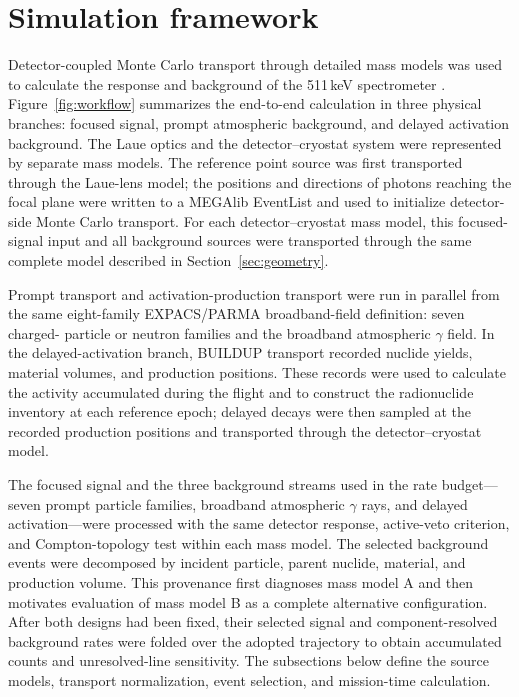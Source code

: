 \documentclass[11pt]{article}
\begin{document}
\FloatBarrier

\section{Simulation framework}
\label{sec:framework}

Detector-coupled Monte Carlo transport through detailed mass models was used to calculate the response and background of the 511\,keV spectrometer \cite{Sturner2003}. Figure~\ref{fig:workflow} summarizes the end-to-end calculation in three physical branches: focused signal, prompt atmospheric background, and delayed activation background. The Laue optics and the detector--cryostat system were represented by separate mass models. The reference point source was first transported through the Laue-lens model; the positions and directions of photons reaching the focal plane were written to a MEGAlib EventList and used to initialize detector-side Monte Carlo transport. For each detector--cryostat mass model, this focused-signal input and all background sources were transported through the same complete model described in Section~\ref{sec:geometry}.

Prompt transport and activation-production transport were run in parallel from
the same eight-family EXPACS/PARMA broadband-field definition: seven charged-
particle or neutron families and the broadband atmospheric $\gamma$ field. In
the delayed-activation branch, BUILDUP transport recorded nuclide yields,
material volumes, and production positions. These records were used to
calculate the activity accumulated during the flight and to construct the
radionuclide inventory at each reference epoch; delayed decays were then
sampled at the recorded production positions and transported through the
detector--cryostat model.

The focused signal and the three background streams used in the rate budget---
seven prompt particle families, broadband atmospheric $\gamma$ rays, and
delayed activation---were processed with the same detector response,
active-veto criterion, and Compton-topology test within each mass model. The
selected background events were decomposed by incident particle, parent
nuclide, material, and production volume. This provenance first diagnoses mass
model A and then motivates evaluation of mass model B as a complete alternative
configuration. After both designs had been fixed, their selected signal and
component-resolved background rates were folded over the adopted trajectory to
obtain accumulated counts and unresolved-line sensitivity. The subsections
below define the source models, transport normalization, event selection, and
mission-time calculation.
\end{document}
